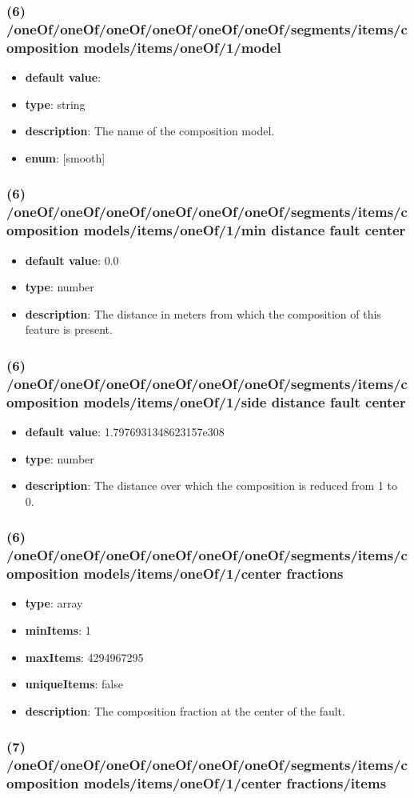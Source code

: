 \subsubsection{(6) /oneOf/oneOf/oneOf/oneOf/oneOf/oneOf/segments/items/composition models/items/oneOf/1/model}
\begin{itemize}[leftmargin=6em]\item {\bf default value}: 
\item {\bf type}: string
\item {\bf description}: The name of the composition model.
\item {\bf enum}: [smooth]\end{itemize}\subsubsection{(6) /oneOf/oneOf/oneOf/oneOf/oneOf/oneOf/segments/items/composition models/items/oneOf/1/min distance fault center}
\begin{itemize}[leftmargin=6em]\item {\bf default value}: 0.0
\item {\bf type}: number
\item {\bf description}: The distance in meters from which the composition of this feature is present.
\end{itemize}\subsubsection{(6) /oneOf/oneOf/oneOf/oneOf/oneOf/oneOf/segments/items/composition models/items/oneOf/1/side distance fault center}
\begin{itemize}[leftmargin=6em]\item {\bf default value}: 1.7976931348623157e308
\item {\bf type}: number
\item {\bf description}: The distance over which the composition is reduced from 1 to 0.
\end{itemize}\subsubsection{(6) /oneOf/oneOf/oneOf/oneOf/oneOf/oneOf/segments/items/composition models/items/oneOf/1/center fractions}
\begin{itemize}[leftmargin=6em]\item {\bf type}: array
\item {\bf minItems}: 1
\item {\bf maxItems}: 4294967295
\item {\bf uniqueItems}: false
\item {\bf description}: The composition fraction at the center of the fault.
\end{itemize}\subsubsection{(7) /oneOf/oneOf/oneOf/oneOf/oneOf/oneOf/segments/items/composition models/items/oneOf/1/center fractions/items}
